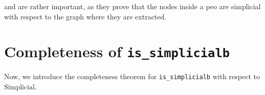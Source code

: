  and  are rather important, as they prove that the nodes inside a \gls{peo} are simplicial with respect to the graph where they are extracted.

\section{Completeness of \texttt{is\_simplicialb}}

Now, we introduce the completeness theorem for \texttt{is\_simplicialb} with respect to $\mathrm{Simplicial}$.

\begin{theorem}

\end{theorem}